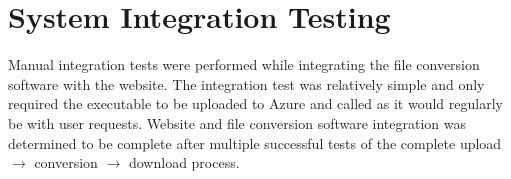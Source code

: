 
\section{System Integration Testing}
Manual integration tests were performed while integrating the file conversion software with the website. The integration test was relatively simple and only required the executable to be uploaded to Azure and called as it would regularly be with user requests. Website and file conversion software integration was determined to be complete after multiple successful tests of the complete upload $\rightarrow$ conversion $\rightarrow$ download process.